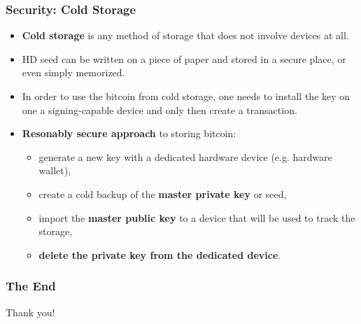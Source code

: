 \documentclass{beamer}
\begin{document}
\begin{frame}
  \frametitle{Security: Cold Storage}
  \begin{itemize}
  \item \textbf{Cold storage} is any method of storage that does not involve
    devices at all.
  \item HD seed can be written on a piece of paper and stored in a secure place,
    or even simply memorized.
  \item In order to use the bitcoin from cold storage, one needs to install the
    key on one a signing-capable device and only then create a transaction.
  \item \textbf{Resonably secure approach} to storing bitcoin:
    \begin{itemize}
    \item generate a new key with a dedicated hardware device (e.g. hardware
      wallet),
    \item create a cold backup of the \textbf{master private key} or seed,
    \item import the \textbf{master public key} to a device that will be used to
      track the storage,
    \item \textbf{delete the private key from the dedicated device}.
    \end{itemize}
  \end{itemize}
\end{frame}

\begin{frame}
  \frametitle{The End}
  \begin{center}
    Thank you!
  \end{center}
\end{frame}
\end{document}
